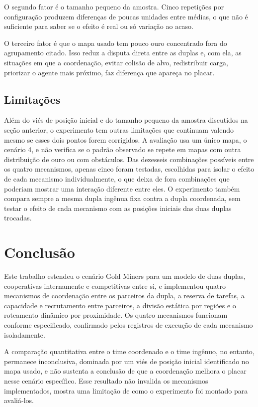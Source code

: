 \documentclass{article}
\begin{document}
O segundo fator é o tamanho pequeno da amostra. Cinco repetições por
configuração produzem diferenças de poucas unidades entre médias, o que não
é suficiente para saber se o efeito é real ou só variação ao acaso.

O terceiro fator é que o mapa usado tem pouco ouro concentrado fora do
agrupamento citado. Isso reduz a disputa direta entre as duplas e, com ela,
as situações em que a coordenação, evitar colisão de alvo, redistribuir
carga, priorizar o agente mais próximo, faz diferença que apareça no
placar.

\subsection{Limitações}

Além do viés de posição inicial e do tamanho pequeno da amostra discutidos
na seção anterior, o experimento tem outras limitações que continuam
valendo mesmo se esses dois pontos forem corrigidos. A avaliação usa um
único mapa, o cenário 4, e não verifica se o padrão observado se repete em
mapas com outra distribuição de ouro ou com obstáculos. Das dezesseis
combinações possíveis entre os quatro mecanismos, apenas cinco foram
testadas, escolhidas para isolar o efeito de cada mecanismo individualmente,
o que deixa de fora combinações que poderiam mostrar uma interação diferente
entre eles. O experimento também compara sempre a mesma dupla ingênua fixa
contra a dupla coordenada, sem testar o efeito de cada mecanismo com as
posições iniciais das duas duplas trocadas.

\section{Conclusão}

Este trabalho estendeu o cenário Gold Miners para um modelo de duas duplas,
cooperativas internamente e competitivas entre si, e implementou quatro
mecanismos de coordenação entre os parceiros da dupla, a reserva de tarefas,
a capacidade e recrutamento entre parceiros, a divisão estática por regiões
e o roteamento dinâmico por proximidade. Os quatro mecanismos funcionam
conforme especificado, confirmado pelos registros de execução de cada
mecanismo isoladamente.

A comparação quantitativa entre o time coordenado e o time ingênuo, no
entanto, permanece inconclusiva, dominada por um viés de posição inicial
identificado no mapa usado, e não sustenta a conclusão de que a coordenação
melhora o placar nesse cenário específico. Esse resultado não invalida os
mecanismos implementados, mostra uma limitação de como o experimento foi
montado para avaliá-los.
\end{document}
